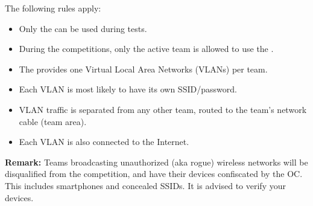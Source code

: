 The following rules apply:

\begin{itemize}
	\item Only the  can be used during tests.
	\item During the competitions, only the active team is allowed to use the .
	\item The  provides one Virtual Local Area Networks (VLANs) per team.
	\item Each VLAN is most likely to have its own SSID/password.
	\item VLAN traffic is separated from any other team, routed to the team's network cable (team area).
	\item Each VLAN is also connected to the Internet.
\end{itemize}

\indent\textbf{Remark:} Teams broadcasting unauthorized (aka rogue) wireless networks will be disqualified from the competition, and have their devices confiscated by the OC.
This includes smartphones and concealed SSIDs.
It is advised to verify your devices.


